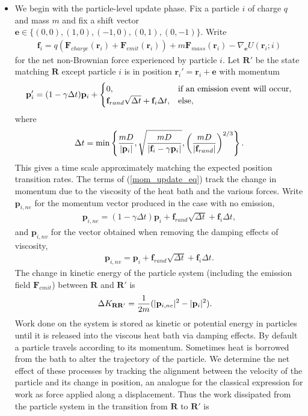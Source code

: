 \documentclass[12pt,letterpaper]{article}
\newcommand{\mb}{\mathbf}
\begin{document}
\begin{itemize}
\item We begin with the particle-level update phase. Fix a particle $i$ of charge $q$ and mass $m$ and fix a shift vector $\mb{e} \in \{(0, 0), (1, 0), (-1, 0), (0, 1), (0, -1)\}$. Write
\begin{align*}
\mb{f}_{i} = q(\mb{F}_{charge}(\mb{r}_{i}) + \mb{F}_{emit}(\mb{r}_{i})) + m\mb{F}_{mass}(\mb{r}_{i}) - \nabla_{\mb{e}} U(\mb{r}_{i}; i)
\end{align*}
for the net non-Brownian force experienced by particle $i$. Let $\mb{R}'$ be the state matching $\mb{R}$ except particle $i$ is in position $\mb{r}_{i}' = \mb{r}_{i} + \mb{e}$ with momentum
\begin{align}
\label{mom_update_eq}
\mb{p}'_{i} = (1 - \gamma \Delta t)\mb{p}_{i} + \begin{cases}
0, &\textnormal{if an emission event will occur}, \\
\mb{f}_{rand}\sqrt{\Delta t} + \mb{f}_{i} \Delta t, &\textnormal{else},
\end{cases}
\end{align}
where
\begin{align*}
\Delta t = \min\left\{{mD \over |\mb{p}_{i}|}, \sqrt{mD \over |\mb{f}_{i} - \gamma\mb{p}_{i}|}, \left(mD \over |\mb{f}_{rand}|\right)^{2/3}\right\}.
\end{align*}
This gives a time scale approximately matching the expected position transition rates. The terms of (\ref{mom_update_eq}) track the change in momentum due to the viscosity of the heat bath and the various forces. Write $\mb{p}_{i,ne}$ for the momentum vector produced in the case with no emission,
\begin{align*}
\mb{p}_{i,ne} = (1 - \gamma \Delta t)\mb{p}_{i} + \mb{f}_{rand}\sqrt{\Delta t} + \mb{f}_{i}\Delta t,
\end{align*}
and $\mb{p}_{i,nv}$ for the vector obtained when removing the damping effects of viscosity,
\begin{align}
\label{mom_nv_eq}
\mb{p}_{i,nv} = \mb{p}_{i} + \mb{f}_{rand}\sqrt{\Delta t} + \mb{f}_{i}\Delta t.
\end{align}
The change in kinetic energy of the particle system (including the emission field $\mb{F}_{emit}$) between $\mb{R}$ and $\mb{R}'$ is
\begin{align*}
\Delta K_{\mb{R}\mb{R}'} &= {1 \over 2m}(|\mb{p}_{i,ne}|^{2} - |\mb{p}_{i}|^{2}).
\end{align*}
Work done on the system is stored as kinetic or potential energy in particles until it is released into the viscous heat bath via damping effects. By default a particle travels according to its momentum. Sometimes heat is borrowed from the bath to alter the trajectory of the particle. We determine the net effect of these processes by tracking the alignment between the velocity of the particle and its change in position, an analogue for the classical expression for work as force applied along a displacement. Thus the work dissipated from the particle system in the transition from $\mb{R}$ to $\mb{R}'$ is

\end{itemize}
\end{document}
